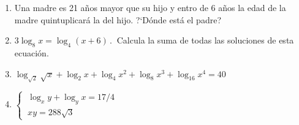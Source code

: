 \begin{enumerate}
\vspace{-6mm}
\begin{flushright}
\begin{footnotesize} \textcolor{gris}{}	\end{footnotesize}
\end{flushright}

\item	Una madre es 21 años mayor que su hijo y entro de 6 años la edad de la madre quintuplicará la del hijo. ?`Dónde está el padre?

\vspace{-6mm}
\begin{flushright}
\begin{footnotesize} \textcolor{gris}{}	\end{footnotesize}
\end{flushright}

\item	$3\log_8x=\log_4(x+6)\, . \ $ Calcula la suma de todas las soluciones de esta ecuación.

\vspace{-6mm}
\begin{flushright}
\begin{footnotesize} \textcolor{gris}{}	\end{footnotesize}
\end{flushright}

\item	$\log_{\sqrt{2}}\sqrt{x}+\log_2x+\log_4x^2+\log_8x^3+\log_{16}{x^4}=40$

\vspace{-6mm}
\begin{flushright}
\begin{footnotesize} \textcolor{gris}{}	\end{footnotesize}
\end{flushright}

\item $\begin{cases} \ \log_xy+\log_yx=17/4 \\ \ xy=288\sqrt{3} \end{cases}$


\end{enumerate}
